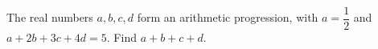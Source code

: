 The real numbers $a,b,c,d$ form an arithmetic progression, with $a=\dfrac{1}{2}$ and $a+2b+3c+4d=5$. Find $a+b+c+d$.
